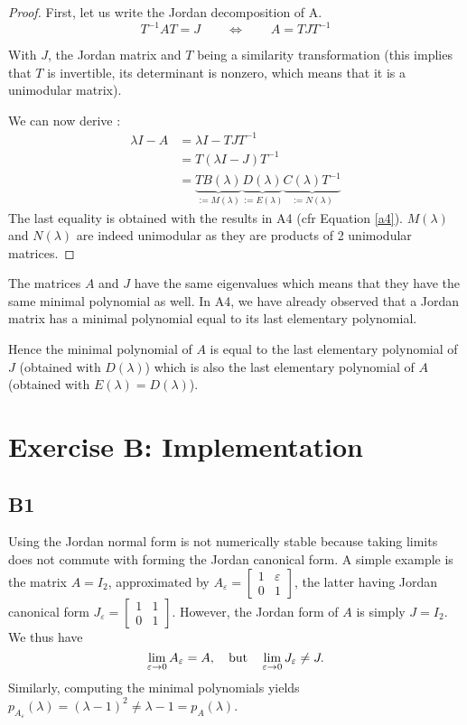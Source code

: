 \documentclass[11pt]{article}
\begin{document}
\begin{proof}
First, let us write the Jordan decomposition of A.
\[T^{-1} A T =J \qquad \Leftrightarrow \qquad A= T J T^{-1}
\]

With $J$, the Jordan matrix and $T$ being a similarity transformation (this implies that $T$ is invertible, its determinant is nonzero, which means that it is a unimodular matrix).

We can now derive :
\begin{align*}
\lambda I - A &= \lambda I - T J T^{-1}\\
&= T(\lambda I - J) T^{-1}\\
&= \underbrace{TB(\lambda)}_{:=M(\lambda)}\underbrace{D(\lambda)}_{:= E(\lambda)}\underbrace{C(\lambda)T^{-1}}_{:= N(\lambda)}
\end{align*}
The last equality is obtained with the results in A4 (cfr Equation \ref{a4}). 
$M(\lambda)$ and $N(\lambda)$ are indeed unimodular as they are products of 2 unimodular matrices.
\end{proof}

The matrices $A$ and $J$ have the same eigenvalues which means that they have the same minimal polynomial as well. In A4, we have already observed that a Jordan matrix has a minimal polynomial equal to its last elementary polynomial.

Hence the minimal polynomial of $A$ is equal to the last elementary polynomial of $J$ (obtained with $D(\lambda)$) which is also the last elementary polynomial of $A$ (obtained with $E(\lambda) = D(\lambda)$). 
\section*{Exercise B: Implementation}
\subsection*{B1}
Using the Jordan normal form is not numerically stable because taking limits does not commute with forming the Jordan canonical form.
A simple example is the matrix \(A = I_2\), approximated by \(A_\varepsilon = \left[\begin{smallmatrix} 1 & \varepsilon \\ 0 & 1\end{smallmatrix}\right]\), the latter having Jordan canonical form \(J_\varepsilon = \left[\begin{smallmatrix} 1 & 1 \\ 0 & 1\end{smallmatrix}\right]\).
However, the Jordan form of \(A\) is simply \(J = I_2\).
We thus have
\[
\lim_{\varepsilon \to 0} A_\varepsilon = A, \quad \textnormal{but} \quad \lim_{\varepsilon \to 0} J_\varepsilon \neq J.
\]
Similarly, computing the minimal polynomials yields \(p_{A_\varepsilon}(\lambda) = (\lambda - 1)^2 \ne \lambda - 1 = p_A(\lambda)\).
\end{document}
